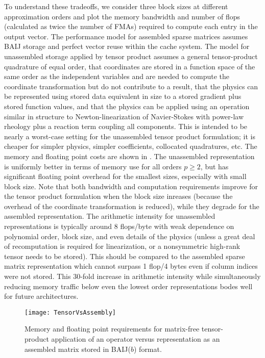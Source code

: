 To understand these tradeoffs, we consider three block sizes at different approximation orders and plot the memory bandwidth and number of flops (calculated as twice the number of FMAs) required to compute each entry in the output vector.
The performance model for assembled sparse matrices assumes BAIJ storage and perfect vector reuse within the cache system.
The model for unassembled storage applied by tensor product assumes a general tensor-product quadrature of equal order, that coordinates are stored in a function space of the same order as the independent variables and are needed to compute the coordinate transformation but do not contribute to a result, that the physics can be represented using stored data equivalent in size to a stored gradient plus stored function values, and that the physics can be applied using an operation similar in structure to Newton-linearization of Navier-Stokes with power-law rheology plus a reaction term coupling all components.
This is intended to be nearly a worst-case setting for the unassembled tensor product formulation; it is cheaper for simpler physics, simpler coefficients, collocated quadratures, etc.
The memory and floating point costs are shown in .
The unassembled representation is uniformly better in terms of memory use for all orders $p \ge 2$, but has significant floating point overhead for the smallest sizes, especially with small block size.
Note that both bandwidth and computation requirements improve for the tensor product formulation when the block size inreases (because the overhead of the coordinate transformation is reduced), while they degrade for the assembled representation.
The arithmetic intensity for unassembled representations is typically around 8 flops/byte with weak dependence on polynomial order, block size, and even details of the physics (unless a great deal of recomputation is required for linearization, or a nonsymmetric high-rank tensor needs to be stored).
This should be compared to the assembled sparse matrix representation which cannot surpass 1 flop/4 bytes even if column indices were not stored.
This 30-fold increase in arithmetic intensity while simultaneously reducing memory traffic below even the lowest order representations bodes well for future architectures.

\begin{figure}
  \centering
  \texttt{[image: TensorVsAssembly]}
  \caption{Memory and floating point requirements for matrix-free tensor-product application of an operator versus representation as an assembled matrix stored in BAIJ($b$) format.}\label{fig:tensorasm}
\end{figure}
